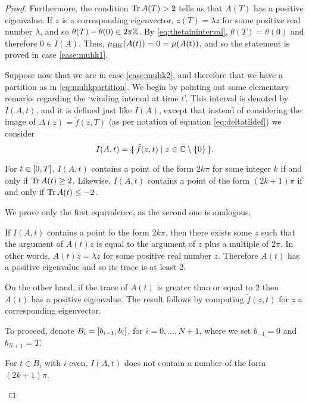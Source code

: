 \begin{proof}
Furthermore, the condition $\operatorname{Tr} A(T) > 2$ tells us that $A(T)$ has a positive eigenvalue. If $z$ is a corresponding eigenvector, $z(T) = \lambda z$ for some positive real number $\lambda$, and so $\theta(T) - \theta(0) \in 2 \pi \mathbb{Z}$. By \eqref{eq:thetaininterval}, $\theta(T) = \theta(0)$ and therefore $0 \in I(A)$. Thus, $\mu_{\mathrm{HK}}(A(t)) = 0 = \mu(A(t))$, and so the statement is proved in case \ref{case:muhk1}.

\smallskip

Suppose now that we are in case \ref{case:muhk2}, and therefore that we have a partition as in \ref{eq:muhkpartition}. We begin by pointing out some elementary remarks regarding the `winding interval at time $t$'. This interval is denoted by $I(A,t)$, and it is defined just like $I(A)$, except that instead of considering the image of $\Delta(z) = \tilde f(z,T)$ (as per notation of equation \eqref{eq:deltatildef}) we consider
\begin{equation}
I(A,t) = \{\, \tilde f(z,t) \mid z \in \mathbb{C} \setminus \{0\} \,\}.
\end{equation}

\begin{lemma}\label{lemma:hk1}
For $t \in \interval0T$, $I(A,t)$ contains a point of the form $2k\pi$ for some integer $k$ if and only if $\operatorname{Tr} A(t) \geq 2$. Likewise, $I(A,t)$ contains a point of the form $(2k+1)\pi$ if and only if $\operatorname{Tr} A(t) \leq -2$.
\end{lemma}

\begin{lemmaproof}
We prove only the first equivalence, as the second one is analogous.

If $I(A,t)$ contains a point fo the form $2k\pi$, then there exists some $z$ such that the argument of $A(t) z$ is equal to the argument of $z$ plus a multiple of $2\pi$. In other words, $A(t) z = \lambda z$ for some positive real number $z$. Therefore $A(t)$ has a positive eigenvalue and so its trace is at least 2.

On the other hand, if the trace of $A(t)$ is greater than or equal to 2 then $A(t)$ has a positive eigenvalue. The result follows by computing $\tilde f(z,t)$ for $z$ a corresponding eigenvector.
\end{lemmaproof}

To proceed, denote $B_i = \interval{b_{i-1}}{b_i}$, for $i = 0, \dots, N+1$, where we set $b_{-1} = 0$ and $b_{N+1} = T$.

\begin{lemma}\label{lemma:hk2}
For $t \in B_i$ with $i$ even, $I(A,t)$ does not contain a number of the form $(2k+1)\pi$.


\end{lemma}
\end{proof}
